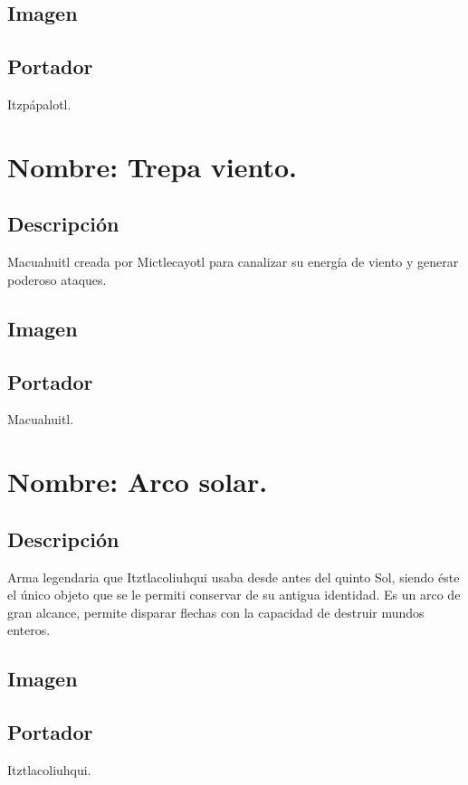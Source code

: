 \subsection{Imagen}
\subsection{Portador}
Itzpápalotl.

\section{Nombre: Trepa viento.}\label{Arma:EspadaMictlecayotl}
\subsection{Descripción}
Macuahuitl creada por Mictlecayotl para canalizar su energía de viento y generar poderoso ataques.
\subsection{Imagen}
\subsection{Portador}
Macuahuitl.

\section{Nombre: Arco solar.}\label{Arma:ArcoItztla}
\subsection{Descripción}
Arma legendaria que Itztlacoliuhqui usaba desde antes del quinto Sol, siendo éste el único objeto que se le permiti conservar de su antigua identidad. Es un arco de gran alcance, permite disparar flechas con la capacidad de destruir mundos enteros. 
\subsection{Imagen}
\subsection{Portador}
Itztlacoliuhqui.